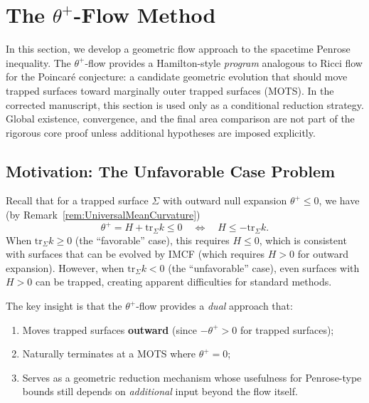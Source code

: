 \section{The \texorpdfstring{$\theta^+$}{Theta-Plus}-Flow Method}
\label{sec:theta-flow}

In this section, we develop a geometric flow approach to the spacetime Penrose inequality. The $\theta^+$-flow provides a Hamilton-style \emph{program} analogous to Ricci flow for the Poincar\'e conjecture: a candidate geometric evolution that should move trapped surfaces toward marginally outer trapped surfaces (MOTS). In the corrected manuscript, this section is used only as a conditional reduction strategy. Global existence, convergence, and the final area comparison are not part of the rigorous core proof unless additional hypotheses are imposed explicitly.

\subsection{Motivation: The Unfavorable Case Problem}
\label{subsec:unfavorable-motivation}

Recall that for a trapped surface $\Sigma$ with outward null expansion $\theta^+ \leq 0$, we have (by Remark~\ref{rem:UniversalMeanCurvature})
\begin{equation}
\theta^+ = H + \mathrm{tr}_\Sigma k \leq 0 \quad \Longleftrightarrow \quad H \leq -\mathrm{tr}_\Sigma k.
\end{equation}
When $\mathrm{tr}_\Sigma k \geq 0$ (the ``favorable'' case), this requires $H \leq 0$, which is consistent with surfaces that can be evolved by IMCF (which requires $H > 0$ for outward expansion). However, when $\mathrm{tr}_\Sigma k < 0$ (the ``unfavorable'' case), even surfaces with $H > 0$ can be trapped, creating apparent difficulties for standard methods.

The key insight is that the $\theta^+$-flow provides a \emph{dual} approach that:
\begin{enumerate}
\item Moves trapped surfaces \textbf{outward} (since $-\theta^+ > 0$ for trapped surfaces);
\item Naturally terminates at a MOTS where $\theta^+ = 0$;
\item Serves as a geometric reduction mechanism whose usefulness for Penrose-type bounds still depends on \emph{additional} input beyond the flow itself.
\end{enumerate}

